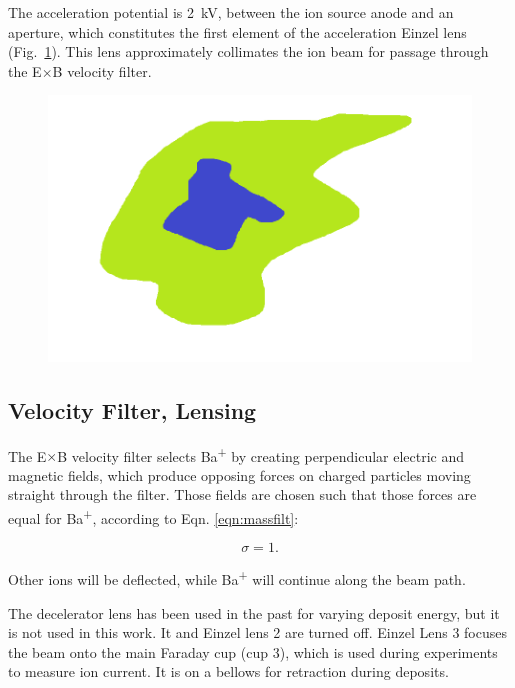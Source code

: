 The acceleration potential is 2~kV, between the ion source anode and an aperture, which constitutes the first element of the acceleration Einzel lens (Fig.~\ref{fig:testfig}).  This lens approximately collimates the ion beam for passage through the E$\times$B velocity filter.

\begin{figure}[H]
        \centering
                \includegraphics[width=.9\textwidth]{figures/figer.png}
                \caption{}
\label{fig:testfig}
\end{figure}

\subsection{Velocity Filter, Lensing}

The E$\times$B velocity filter selects Ba\textsuperscript{+} by creating perpendicular electric and magnetic fields, which produce opposing forces on charged particles moving straight through the filter.  Those fields are chosen such that those forces are equal for Ba\textsuperscript{+}, according to Eqn. \ref{eqn:massfilt}:

\begin{equation}
\sigma = 1.
\label{eqn:massfilt}
\end{equation}

\noindent
Other ions will be deflected, while Ba\textsuperscript{+} will continue along the beam path.

The decelerator lens has been used in the past for varying deposit energy, but it is not used in this work.  It and Einzel lens 2 are turned off.  Einzel Lens 3 focuses the beam onto the main Faraday cup (cup 3), which is used during experiments to measure ion current.  It is on a bellows for retraction during deposits.

